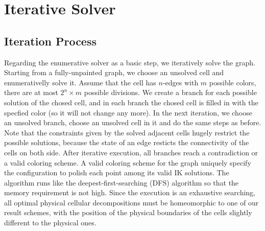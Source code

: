 \documentclass[journal]{IEEEtran}
\begin{document}
\section{Iterative Solver}\label{sectioniterativesolver}


\subsection{Iteration Process}
Regarding the enumerative solver as a basic step, we iteratively solve the graph. 
Starting from a fully-unpainted graph, we choose an unsolved cell and enumerativelly solve it. 
Assume that the cell has $n$-edges with $m$ possible colors, there are at most $2^n\times m$ possible divisions. We create a branch for each possible solution of the chosed cell, and in each branch the chosed cell is filled in with the specfied color (so it will not change any more). 
In the next iteration, we choose an unsolved branch, choose an unsolved cell in it and do the same steps as before. 
Note that the constraints given by the solved adjacent cells hugely restrict the possible solutions, because the state of an edge resticts the connectivity of the cells on both side. 
After iterative execution, all branches reach a contradiction or a valid coloring scheme. A valid coloring scheme for the graph uniquely specify the configuration to polish each point among its valid IK solutions. 
The algorithm runs like the deepest-first-searching (DFS) algorithm so that the memory requirement is not high. 
Since the execution is an exhaustive searching, all optimal physical cellular decompositions must be homeomorphic to one of our result schemes, with the position of the physical boundaries of the cells slightly different to the physical ones.
\end{document}
